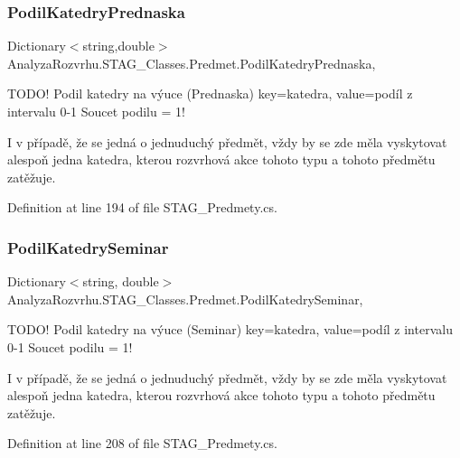 \subsubsection{\texorpdfstring{Podil\+Katedry\+Prednaska}{PodilKatedryPrednaska}}
{\footnotesize\ttfamily Dictionary$<$string,double$>$ Analyza\+Rozvrhu.\+S\+T\+A\+G\+\_\+\+Classes.\+Predmet.\+Podil\+Katedry\+Prednaska\hspace{0.3cm}{\ttfamily [get]}, {\ttfamily [set]}}



T\+O\+D\+O! Podil katedry na výuce (Prednaska) key=katedra, value=podíl z intervalu 0-\/1 Soucet podilu = 1! 

I v případě, že se jedná o jednuduchý předmět, vždy by se zde měla vyskytovat alespoň jedna katedra, kterou rozvrhová akce tohoto typu a tohoto předmětu zatěžuje.

Definition at line 194 of file S\+T\+A\+G\+\_\+\+Predmety.\+cs.

\mbox{\label{class_analyza_rozvrhu_1_1_s_t_a_g___classes_1_1_predmet_a03255074fb9e471f282305d05a742418}} 
\subsubsection{\texorpdfstring{Podil\+Katedry\+Seminar}{PodilKatedrySeminar}}
{\footnotesize\ttfamily Dictionary$<$string, double$>$ Analyza\+Rozvrhu.\+S\+T\+A\+G\+\_\+\+Classes.\+Predmet.\+Podil\+Katedry\+Seminar\hspace{0.3cm}{\ttfamily [get]}, {\ttfamily [set]}}



T\+O\+D\+O! Podil katedry na výuce (Seminar) key=katedra, value=podíl z intervalu 0-\/1 Soucet podilu = 1! 

I v případě, že se jedná o jednuduchý předmět, vždy by se zde měla vyskytovat alespoň jedna katedra, kterou rozvrhová akce tohoto typu a tohoto předmětu zatěžuje.

Definition at line 208 of file S\+T\+A\+G\+\_\+\+Predmety.\+cs.

\mbox{\label{class_analyza_rozvrhu_1_1_s_t_a_g___classes_1_1_predmet_a7deb6f732d1aa0f1aa32fb5dfabd7945}} 
